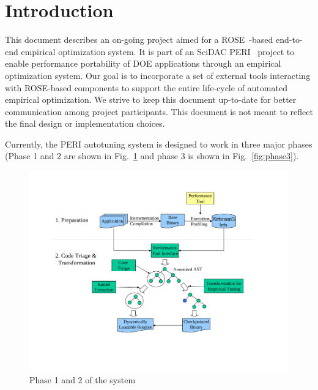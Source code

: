 \section{Introduction}
This document describes an on-going project aimed for a ROSE~\cite{roseWeb2008}-based end-to-end empirical optimization system. 
It is part of an SciDAC PERI~\cite{peri} project to enable performance portability of DOE applications through an empirical optimization system.
Our goal is to incorporate a set of external tools interacting with
ROSE-based components to support the entire life-cycle of automated empirical optimization.
We strive to keep this document up-to-date for better communication among
project participants. 
This document is not meant to reflect the final design or implementation choices. 

Currently, the PERI autotuning system is designed to work in three major phases 
(Phase 1 and 2 are shown in Fig.~\ref{fig:phase12} and phase 3 is shown 
in Fig.~\ref{fig:phase3}). 

\begin{figure}[htbp]  
	\centering
		\includegraphics[width=1.2\textwidth]{phase12.pdf}
	\caption{Phase 1 and 2 of the system}
	\label{fig:phase12}
\end{figure}

